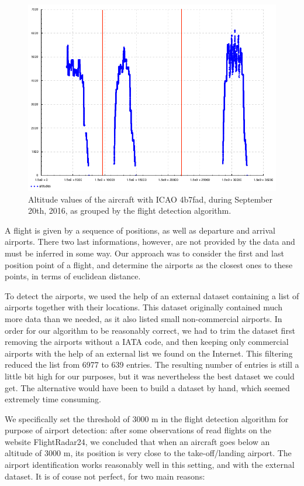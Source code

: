 \documentclass{vldb}
\begin{document}
\begin{figure}[t]
  \centering
  \includegraphics[scale=0.28]{imgs/4b7fad-altitudes-grouped.png}
  \caption{Altitude values of the aircraft with ICAO 4b7fad, during September
    20th, 2016, as grouped by the flight detection algorithm.}
  \label{fig:alts}
\end{figure}

A flight is given by a sequence of positions, as well as departure and arrival
airports. There two last informations, however, are not provided by the data and
must be inferred in some way. Our approach was to consider the first and last
position point of a flight, and determine the airports as the closest ones to
these points, in terms of euclidean distance.

To detect the airports, we used the help of an external dataset containing a
list of airports together with their locations. This dataset originally
contained much more data than we needed, as it also listed small non-commercial
airports. In order for our algorithm to be reasonably correct, we had to trim
the dataset first removing the airports without a IATA code, and then keeping
only commercial airports with the help of an external list we found on the
Internet. This filtering reduced the list from 6977 to 639 entries.
The resulting number of entries is still a little bit high for our purposes, but
it was nevertheless the best dataset we could get. The alternative would have
been to build a dataset by hand, which seemed extremely time consuming.

We specifically set the threshold of 3000 m in the flight detection algorithm
for purpose of airport detection: after some observations of read flights on the
website FlightRadar24, we concluded that when an aircraft goes below an altitude
of 3000 m, its position is very close to the take-off/landing airport. The
airport identification works reasonably well in this setting, and with the
external dataset. It is of couse not perfect, for two main reasons:
\end{document}
